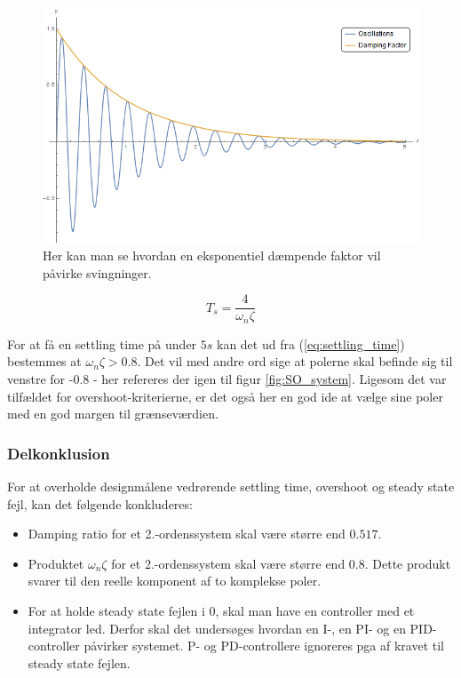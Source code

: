 \begin{figure}[ht]
	\begin{center}
		\includegraphics[scale=0.45]{Billeder/Damped_Oscillations.png}
	\end{center}
\caption{Her kan man se hvordan en eksponentiel dæmpende faktor vil påvirke svingninger.}
\label{fig:Damped_Oscillations}
\end{figure}

\begin{equation}\label{eq:settling_time}
T_{s}=\frac{4}{\omega_{n}\zeta}
\end{equation}

For at få en settling time på under $5s$ kan det ud fra (\ref{eq:settling_time}) bestemmes at $\omega_{n}\zeta > 0.8$. Det vil med andre ord sige at polerne skal befinde sig til venstre for -0.8 - her refereres der igen til figur \ref{fig:SO_system}. Ligesom det var tilfældet for overshoot-kriterierne, er det også her en god ide at vælge sine poler med en god margen til grænseværdien.

\subsubsection{Delkonklusion}

For at overholde designmålene vedrørende settling time, overshoot og steady state fejl, kan det følgende konkluderes:

\begin{itemize}
\item Damping ratio for et 2.-ordenssystem skal være større end $0.517$.
\item Produktet $\omega_{n}\zeta$ for et 2.-ordenssystem skal være større end $0.8$. Dette produkt svarer til den reelle komponent af to komplekse poler.
\item For at holde steady state fejlen i 0, skal man have en controller med et integrator led. Derfor skal det undersøges hvordan en I-, en PI- og en PID-controller påvirker systemet. P- og PD-controllere ignoreres pga af kravet til steady state fejlen.
\end{itemize}

